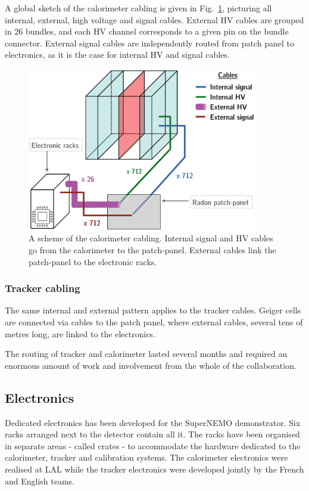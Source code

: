 A global sketch of the calorimeter cabling is given in Fig.~\ref{fig:calo_cabling}, picturing all internal, external, high voltage and signal cables.
External HV cables are grouped in $26$ bundles, and each HV channel corresponds to a given pin on the bundle connector.
External signal cables are independently routed from patch panel to electronics, as it is the case for internal HV and signal cables.
\begin{figure}[h]
  \centering
  \includegraphics[width=0.9\textwidth]{SNdemonstrator/fig_SNdemonstrator/calo_cabling.pdf}
  \caption{A scheme of the calorimeter cabling.
    Internal signal and HV cables go from the calorimeter to the patch-panel.
    External cables link the patch-panel to the electronic racks.
    \label{fig:calo_cabling}}
\end{figure}

\subsubsection*{Tracker cabling}

The same internal and external pattern applies to the tracker cables.
Geiger cells are connected via cables to the patch panel, where external cables, several tens of metres long, are linked to the electronics.

The routing of tracker and calorimeter lasted several months and required an enormous amount of work and involvement from the whole of the collaboration.

\subsection{Electronics}

Dedicated electronics has been developed for the SuperNEMO demonstrator.
Six racks arranged next to the detector contain all it.
The racks have been organised in separate areas - called crates - to accommodate the hardware dedicated to the calorimeter, tracker and calibration systems.
The calorimeter electronics were realised at LAL while the tracker electronics were developed jointly by the French and English teams.

